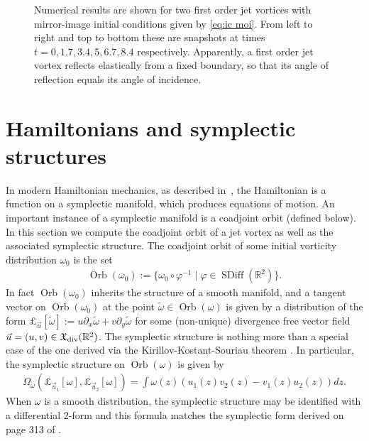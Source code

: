 \documentclass[12pt]{amsart}
\newcommand{\R}{\ensuremath{\mathbb{R}}}
\theoremstyle{remark}
\DeclareMathOperator{\SDiff}{SDiff}
\DeclareMathOperator{\Orb}{Orb}
\begin{document}
\begin{figure}[h!]
	\caption{Numerical results are shown for two first order jet vortices with mirror-image initial conditions given by \eqref{eq:ic moi}.
		From left to right and top to bottom these are snapshots at times $t=0,1.7,3.4,5,6.7,8.4$ respectively. Apparently, a first order jet vortex reflects elastically from a fixed boundary, so that its angle of reflection equals its angle of incidence.}
	\label{fig:moi}
\end{figure}


\section{Hamiltonians and symplectic structures}
\label{sec:symplectic}
In modern Hamiltonian mechanics, as described in~\cite{FOM,Arnold2000},
the Hamiltonian is a function on a symplectic manifold, which produces equations of motion.
An important instance of a symplectic manifold is a coadjoint orbit (defined below).
In this section we compute the coadjoint orbit of a jet vortex
as well as the associated symplectic structure.
The coadjoint orbit of some initial vorticity distribution $\omega_0$ is the set
\begin{align*}
  \Orb(\omega_0) := \{ \omega_0 \circ \varphi^{-1} \mid \varphi \in \SDiff(\R^2) \}.
\end{align*}
In fact $\Orb(\omega_0)$ inherits the structure of a smooth manifold,
and a tangent vector on $\Orb(\omega_0)$ at the point $\tilde{\omega} \in \Orb(\omega)$ is given by 
a distribution of the form $\pounds_{\vec{u}}[\tilde{\omega}] := u \partial_x \tilde{\omega} + v \partial_y \tilde{\omega}$ for some (non-unique) divergence free vector field
$\vec{u} = (u,v) \in \mathfrak{X}_{\rm div}(\R^2)$.
The symplectic structure is nothing more than a special case of the one derived via the Kirillov-Kostant-Souriau theorem \cite[see the boxed formula on p.303]{FOM}.
In particular, the symplectic structure on $\Orb(\omega)$ is given by
\begin{align}
  \Omega_\omega( \pounds_{\vec{u}_1}[\omega] , \pounds_{\vec{u}_2}[\omega] ) = \int \omega(z)  ( u_1(z) v_2(z) - v_1(z) u_2(z) ) dz. \label{eq:symplectic}
\end{align}
When $\omega$ is a smooth distribution, the symplectic structure may be identified with a differential $2$-form and this formula matches the symplectic form derived on page 313 of \cite{MarsdenWeinstein1983}.
\end{document}

